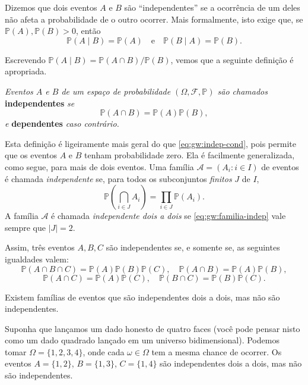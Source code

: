 Dizemos que dois eventos \(A\) e \(B\) são ``independentes'' se a ocorrência
de um deles não afeta a probabilidade de o outro ocorrer. Mais formalmente,
isto exige que, se \(\mathbb{P}(A), \mathbb{P}(B) > 0\), então
\[
  \mathbb{P}(A \mid B) = \mathbb{P}(A) \quad \text{e} \quad \mathbb{P}(B
  \mid A) = \mathbb{P}(B). \label{eq:gw:indep-cond}
\]

Escrevendo \(\mathbb{P}(A \mid B) = \mathbb{P}(A \cap B)/\mathbb{P}(B)\), vemos
que a seguinte definição é apropriada.

\begin{definition}\label{gw:def:independencia}
  \emph{Eventos \(A\) e \(B\) de um espaço de probabilidade \((\Omega,
  \mathcal{F}, \mathbb{P})\) são chamados} \textbf{independentes} \emph{se}
  \[
    \mathbb{P}(A \cap B) = \mathbb{P}(A)\mathbb{P}(B), \label{eq:gw:independencia}
  \]
  \emph{e} \textbf{dependentes} \emph{caso contrário.}
\end{definition}

Esta definição é ligeiramente mais geral do que \eqref{eq:gw:indep-cond}, pois
permite que os eventos \(A\) e \(B\) tenham probabilidade zero. Ela é
facilmente generalizada, como segue, para mais de dois eventos. Uma família
\(\mathcal{A} = (A_i : i \in I)\) de eventos é chamada \emph{independente} se,
para todos os subconjuntos \emph{finitos} \(J\) de \(I\),
\[
  \mathbb{P}\left(\bigcap_{i \in J} A_i\right) = \prod_{i \in J}
  \mathbb{P}(A_i). \label{eq:gw:familia-indep}
\]
A família \(\mathcal{A}\) é chamada \emph{independente dois a dois} se
\eqref{eq:gw:familia-indep} vale sempre que \(|J| = 2\).

Assim, três eventos \(A, B, C\) são independentes se, e somente se, as
seguintes igualdades valem:
\[
  \mathbb{P}(A \cap B \cap C) = \mathbb{P}(A)\mathbb{P}(B)\mathbb{P}(C),
  \quad \mathbb{P}(A \cap B) = \mathbb{P}(A)\mathbb{P}(B),
\]
\[
  \mathbb{P}(A \cap C) = \mathbb{P}(A)\mathbb{P}(C), \quad \mathbb{P}(B \cap
  C) = \mathbb{P}(B)\mathbb{P}(C).
\]

Existem famílias de eventos que são independentes dois a dois, mas não são
independentes.

\begin{example}\label{gw:exemplo:dado-quatro-faces}
  Suponha que lançamos um dado honesto de quatro faces (você pode pensar nisto
  como um dado quadrado lançado em um universo bidimensional). Podemos tomar
  \(\Omega = \{1, 2, 3, 4\}\), onde cada \(\omega \in \Omega\) tem a mesma
  chance de ocorrer. Os eventos \(A = \{1, 2\}\), \(B = \{1, 3\}\), \(C =
  \{1, 4\}\) são independentes dois a dois, mas não são independentes.
\end{example}


